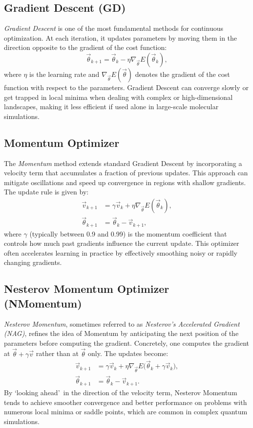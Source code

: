 \subsection{Gradient Descent (GD)}
\label{subsec:gd}
\emph{Gradient Descent} is one of the most fundamental methods for continuous optimization. At each iteration, it updates parameters by moving them in the direction opposite to the gradient of the cost function:
\[
\vec{\theta}_{k+1} = \vec{\theta}_{k} 
- \eta \nabla_{\vec{\theta}} E(\vec{\theta}_{k}),
\]
where \(\eta\) is the learning rate and \(\nabla_{\vec{\theta}} E(\vec{\theta})\) denotes the gradient of the cost function with respect to the parameters. Gradient Descent can converge slowly or get trapped in local minima when dealing with complex or high-dimensional landscapes, making it less efficient if used alone in large-scale molecular simulations.

\subsection{Momentum Optimizer}
\label{subsec:momentum}
The \emph{Momentum} method extends standard Gradient Descent by incorporating a velocity term that accumulates a fraction of previous updates. This approach can mitigate oscillations and speed up convergence in regions with shallow gradients. The update rule is given by:
\[
\begin{aligned}
\vec{v}_{k+1} &= \gamma \vec{v}_{k} 
+ \eta \nabla_{\vec{\theta}} E(\vec{\theta}_{k}),\\
\vec{\theta}_{k+1} &= \vec{\theta}_{k} - \vec{v}_{k+1},
\end{aligned}
\]
where \(\gamma\) (typically between 0.9 and 0.99) is the momentum coefficient that controls how much past gradients influence the current update. This optimizer often accelerates learning in practice by effectively smoothing noisy or rapidly changing gradients.

\subsection{Nesterov Momentum Optimizer (NMomentum)}
\label{subsec:nmomentum}
\emph{Nesterov Momentum}, sometimes referred to as \emph{Nesterov’s Accelerated Gradient (NAG)}, refines the idea of Momentum by anticipating the next position of the parameters before computing the gradient. Concretely, one computes the gradient at \(\vec{\theta} + \gamma \vec{v}\) rather than at \(\vec{\theta}\) only. The updates become:
\[
\begin{aligned}
\vec{v}_{k+1} &= \gamma \vec{v}_{k} 
+ \eta \nabla_{\vec{\theta}}
E\!\big(\vec{\theta}_{k} + \gamma \vec{v}_{k}\big),\\
\vec{\theta}_{k+1} &= \vec{\theta}_{k} - \vec{v}_{k+1}.
\end{aligned}
\]
By \textquoteleft looking ahead\textquoteright\ in the direction of the velocity term, Nesterov Momentum tends to achieve smoother convergence and better performance on problems with numerous local minima or saddle points, which are common in complex quantum simulations.

